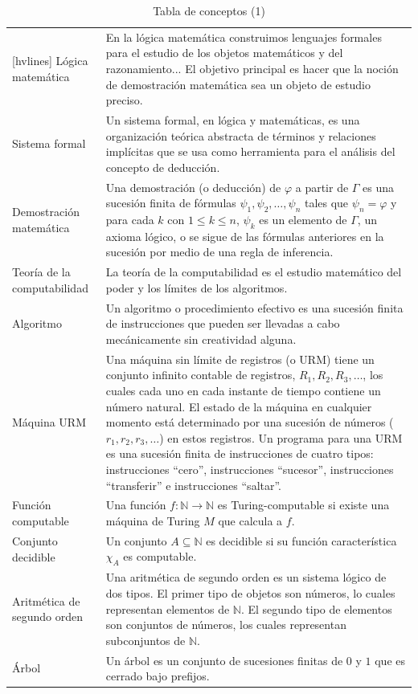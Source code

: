\begin{table}[h]
    \centering
    \caption{Tabla de conceptos (1)}
    \label{tab: tabla_de_conceptos1}
    \begin{NiceTabular}{m{0.2\textwidth}m{0.7\textwidth}}[hvlines]
    Lógica matemática &  En la lógica matemática construimos lenguajes formales para el estudio de los objetos matemáticos y del razonamiento... El objetivo principal es hacer que la noción de demostración matemática sea un objeto de estudio preciso.\citep{Mileti2023-lq}\\
    Sistema formal & Un sistema formal, en lógica y matemáticas, es una organización teórica abstracta de términos y relaciones implícitas que se usa como herramienta para el análisis del concepto de deducción. \citep{Britannica2024FormalSystem}\\
    Demostración matemática & Una demostración (o deducción) de $\varphi$ a partir de $\Gamma$ es una sucesión finita de fórmulas $\psi_{1},\psi_{2},\dotsc,\psi_{n}$ tales que $\psi_{n}=\varphi$ y para cada $k$ con $1\leq k\leq n$, $\psi_{k}$ es un elemento de $\Gamma$, un axioma lógico, o se sigue de las fórmulas anteriores en la sucesión por medio de una regla de inferencia. \citep{Mileti2023-lq}\\
    Teoría de la computabilidad & La teoría de la computabilidad es el estudio matemático del poder y los límites de los algoritmos. \citep{Mileti2023-lq}\\
    Algoritmo & Un algoritmo o procedimiento efectivo es una sucesión finita de instrucciones que pueden ser llevadas a cabo mecánicamente sin creatividad alguna. \citep{Mileti2023-lq}\\
    Máquina URM & Una máquina sin límite de registros (o URM) tiene un conjunto infinito contable de registros, $R_{1}, R_{2}, R_{3},\dotsc$, los cuales cada uno en cada instante de tiempo contiene un número natural. El estado de la máquina en cualquier momento está determinado por una sucesión de números ($r_{1}, r_{2}, r_{3},\dotsc$) en estos registros. Un programa para una URM es una sucesión finita de instrucciones de cuatro tipos: instrucciones ``cero'', instrucciones ``sucesor'', instrucciones ``transferir'' e instrucciones ``saltar''.\citep{Cutland1980}\\
    Función computable &  Una función $f:\mathbb{N}\to\mathbb{N}$ es Turing-computable si existe una máquina de Turing $M$ que calcula a $f$.\citep{Soare2018-wy}\\
    Conjunto decidible & Un conjunto $A\subseteq\mathbb{N}$ es decidible si su función característica $\chi_{A}$ es computable. \citep{Mileti2023-lq}\\
    Aritmética de segundo orden & Una aritmética de segundo orden es un sistema lógico de dos tipos. El primer tipo de objetos son números, lo cuales representan elementos de $\mathbb{N}$. El segundo tipo de elementos son conjuntos de números, los cuales representan subconjuntos de $\mathbb{N}$.\citep{Dzhafarov2023-km}\\
    Árbol & Un árbol es un conjunto de sucesiones finitas de $0$ y $1$ que es cerrado bajo prefijos.\citep{Dzhafarov2023-km}
\end{NiceTabular}
\end{table}
